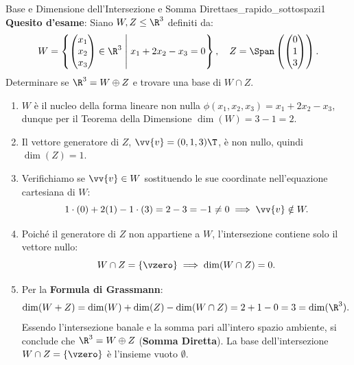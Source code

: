 \begin{esempio}{Base e Dimensione dell'Intersezione e Somma Diretta}{es_rapido_sottospazi1}
\textbf{Quesito d'esame}: Siano $W, Z \le \R^3$ definiti da:
\begin{equation}
    W = \left\{ \begin{pmatrix} x_1 \\ x_2 \\ x_3 \end{pmatrix} \in \R^3 \;\middle|\; x_1 + 2x_2 - x_3 = 0 \right\}, \quad Z = \Span\left( \begin{pmatrix} 0 \\ 1 \\ 3 \end{pmatrix} \right).
\end{equation}
Determinare se $\R^3 = W \oplus Z$ e trovare una base di $W \cap Z$.

\begin{dimostrazione}[Risoluzione]
\begin{enumerate}
    \item $W$ è il nucleo della forma lineare non nulla $\phi(x_1, x_2, x_3) = x_1 + 2x_2 - x_3$, dunque per il Teorema della Dimensione $\dim(W) = 3 - 1 = 2$.
    \item Il vettore generatore di $Z$, $\vv{v} = (0, 1, 3)\T$, è non nullo, quindi $\dim(Z) = 1$.
    \item Verifichiamo se $\vv{v} \in W$ sostituendo le sue coordinate nell'equazione cartesiana di $W$:
    \begin{equation}
        1 \cdot (0) + 2(1) - 1 \cdot (3) = 2 - 3 = -1 \neq 0 \implies \vv{v} \notin W.
    \end{equation}
    \item Poiché il generatore di $Z$ non appartiene a $W$, l'intersezione contiene solo il vettore nullo:
    \begin{equation}
        W \cap Z = \{\vzero\} \implies \dim(W \cap Z) = 0.
    \end{equation}
    \item Per la \textbf{Formula di Grassmann}:
    \begin{equation}
        \dim(W + Z) = \dim(W) + \dim(Z) - \dim(W \cap Z) = 2 + 1 - 0 = 3 = \dim(\R^3).
    \end{equation}
    Essendo l'intersezione banale e la somma pari all'intero spazio ambiente, si conclude che $\R^3 = W \oplus Z$ (\textbf{Somma Diretta}).
    La base dell'intersezione $W \cap Z = \{\vzero\}$ è l'insieme vuoto $\emptyset$.
\end{enumerate}
\end{dimostrazione}
\end{esempio}

